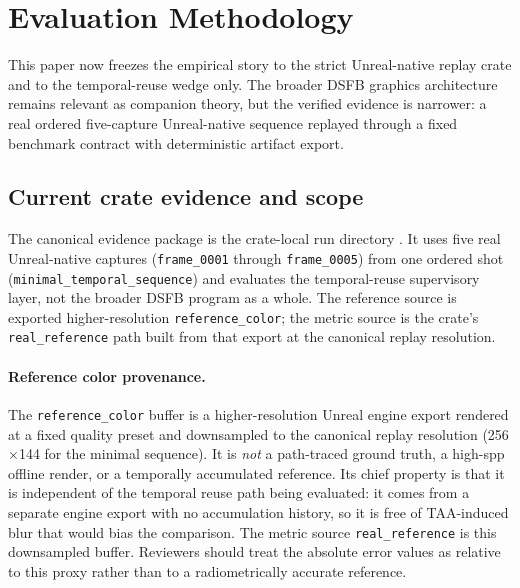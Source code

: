 \documentclass[11pt]{article}
\theoremstyle{definition}
\theoremstyle{plain}
\begin{document}
\section{Evaluation Methodology}
\label{sec:evaluation}

This paper now freezes the empirical story to the strict Unreal-native replay crate and to the temporal-reuse wedge only. The broader DSFB graphics architecture remains relevant as companion theory, but the verified evidence is narrower: a real ordered five-capture Unreal-native sequence replayed through a fixed benchmark contract with deterministic artifact export.

\subsection{Current crate evidence and scope}

The canonical evidence package is the crate-local run directory . It uses five real Unreal-native captures (\texttt{frame\_0001} through \texttt{frame\_0005}) from one ordered shot (\texttt{minimal\_temporal\_sequence}) and evaluates the temporal-reuse supervisory layer, not the broader DSFB program as a whole. The reference source is exported higher-resolution \texttt{reference\_color}; the metric source is the crate's \texttt{real\_reference} path built from that export at the canonical replay resolution.

\paragraph{Reference color provenance.}
The \texttt{reference\_color} buffer is a higher-resolution Unreal engine export rendered at a fixed quality preset and downsampled to the canonical replay resolution (256$\times$144 for the minimal sequence). It is \emph{not} a path-traced ground truth, a high-spp offline render, or a temporally accumulated reference. Its chief property is that it is independent of the temporal reuse path being evaluated: it comes from a separate engine export with no accumulation history, so it is free of TAA-induced blur that would bias the comparison. The metric source \texttt{real\_reference} is this downsampled buffer. Reviewers should treat the absolute error values as relative to this proxy rather than to a radiometrically accurate reference.
\end{document}
